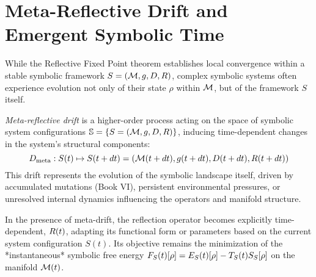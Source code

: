 \section{Meta-Reflective Drift and Emergent Symbolic Time}
\label{sec:bk7_meta_reflective_drift_and_emergent_symbolic_time}
While the Reflective Fixed Point theorem establishes local convergence within a stable symbolic framework \(S = (\mathcal{M}, g, D, R)\), complex symbolic systems often experience evolution not only of their state \(\rho\) within \(\mathcal{M}\), but of the framework \(S\) itself.
\begin{definition}
\label{definition:bk7_meta_reflective_drift__meta}
\emph{Meta-reflective drift} is a higher-order process acting on the space of symbolic system configurations \(\mathbb{S} = \{ S = (\mathcal{M}, g, D, R) \}\), inducing time-dependent changes in the system's structural components:
\[
D_{\mathrm{meta}} : S(t) \mapsto S(t+dt) = (\mathcal{M}(t+dt), g(t+dt), D(t+dt), R(t+dt))
\]
This drift represents the evolution of the symbolic landscape itself, driven by accumulated mutations (Book VI), persistent environmental pressures, or unresolved internal dynamics influencing the operators and manifold structure.
\end{definition}
\begin{definition}
\label{definition:bk7_adaptive_reflection_operator_t}
In the presence of meta-drift, the reflection operator becomes explicitly time-dependent, \(R(t)\), adapting its functional form or parameters based on the current system configuration \(S(t)\). Its objective remains the minimization of the *instantaneous* symbolic free energy \(F_S(t)[\rho] = E_S(t)[\rho] - T_S(t) S_S[\rho]\) on the manifold \(\mathcal{M}(t)\).
\end{definition}
